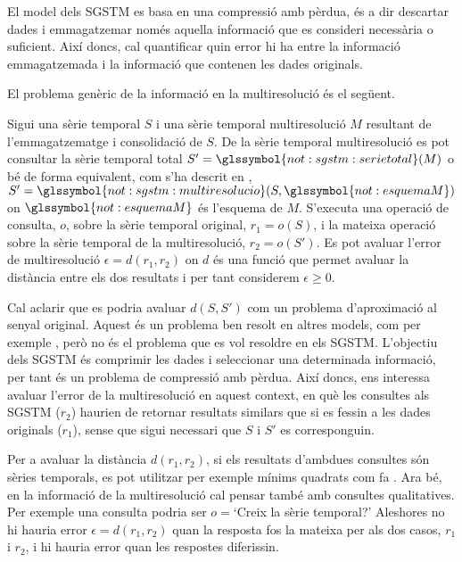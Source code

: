 El model dels \gls{SGSTM} es basa en una compressió amb pèrdua, és a
dir descartar dades i emmagatzemar només aquella informació que es
consideri necessària o suficient. Així doncs, cal quantificar quin
error hi ha entre la informació emmagatzemada i la informació que
contenen les dades originals.


El problema genèric de la informació en la multiresolució és el següent.
\begin{definition}
  \label{def:informacio:error}
  Sigui una sèrie temporal $S$ i una sèrie temporal multiresolució $M$
  resultant de l'emmagatzematge i consolidació de $S$. De la sèrie
  temporal multiresolució es pot consultar la sèrie temporal total
  $S'=\glssymbol{not:sgstm:serietotal}(M)$ o bé de forma equivalent,
  com s'ha descrit en ,
  $S'=\glssymbol{not:sgstm:multiresolucio}(S,\glssymbol{not:esquemaM})$
  on $\glssymbol{not:esquemaM}$ és l'esquema de $M$.  S'executa una
  operació de consulta, $o$, sobre la sèrie temporal original,
  $r_1=o(S)$, i la mateixa operació sobre la sèrie temporal de la
  multiresolució, $r_2=o(S')$. Es pot avaluar l'error de
  multiresolució $\epsilon=d(r_1,r_2)$ on $d$ és una funció que permet
  avaluar la distància entre els dos resultats i per tant considerem
  $\epsilon\geq 0$.
\end{definition}


Cal aclarir que es podria avaluar $d(S,S')$ com un problema
d'aproximació al senyal original. Aquest és un problema ben resolt en
altres models, com per exemple \textcite{last01,ogras06}, però no és
el problema que es vol resoldre en els \gls{SGSTM}.  L'objectiu dels
\gls{SGSTM} és comprimir les dades i seleccionar una determinada
informació, per tant és un problema de compressió amb pèrdua.  Així
doncs, ens interessa avaluar l'error de la multiresolució en aquest
context, en què les consultes als \gls{SGSTM} ($r_2$) haurien de
retornar resultats similars que si es fessin a les dades originals
($r_1$), sense que sigui necessari que $S$ i $S'$ es corresponguin.




Per a avaluar la distància $d(r_1,r_2)$, si els resultats d'ambdues
consultes són sèries temporals, es pot utilitzar per exemple mínims
quadrats com fa \textcite{last01}.  Ara bé, en la informació de la
multiresolució cal pensar també amb consultes qualitatives. Per
exemple una consulta podria ser $o=$`Creix la sèrie temporal?'
Aleshores no hi hauria error $\epsilon=d(r_1,r_2)$ quan la resposta
fos la mateixa per als dos casos, $r_1$ i $r_2$, i hi hauria error
quan les respostes diferissin.



